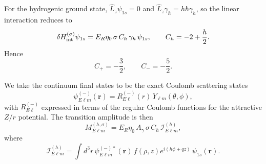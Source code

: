 \documentclass[11pt,a4paper]{article}
\begin{document}
        For the hydrogenic ground state, $\hat L_z\psi_{1s}=0$ and $\hat L_z\gamma_h=h\hbar\gamma_h$, so the linear interaction reduces to
        \begin{equation}
            \delta H_{\rm int}^{(\sigma)}\psi_{1s}
            =
            E_R\eta_0\,\sigma\,C_h\,\gamma_h\,\psi_{1s},
            \qquad
            C_h=-2+\frac{h}{2}.
        \end{equation}
        Hence
        \begin{equation}
            C_{+}=-\frac32,
            \qquad
            C_{-}=-\frac52.
        \end{equation}
        
        We take the continuum final states to be the exact Coulomb scattering states
        \begin{equation}
            \psi_{E\ell m}^{(-)}(\mathbf r)
            =
            R_{E\ell}^{(-)}(r)\,Y_{\ell m}(\theta,\phi),
        \end{equation}
        with $R_{E\ell}^{(-)}$ expressed in terms of the regular Coulomb functions for the attractive $Z/r$ potential. The transition amplitude is then
        \begin{equation}
            M_{E\ell m}^{(h,\sigma)}
            =
            E_R\eta_0\,A_\gamma\,\sigma\,C_h\,\mathcal I_{E\ell m}^{(h)},
        \end{equation}
        where
        \begin{equation}
            \mathcal I_{E\ell m}^{(h)}
            =
            \int d^3r\,
            \psi_{E\ell m}^{(-)*}(\mathbf r)\,
            f(\rho,z)e^{i(h\phi+qz)}\,
            \psi_{1s}(\mathbf r).
        \end{equation}
        
\end{document}
